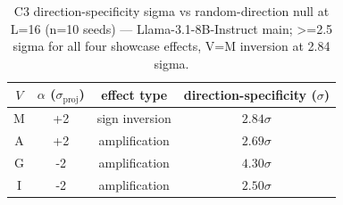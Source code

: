 \begin{table}[t]
\centering
\caption{C3 direction-specificity sigma vs random-direction null at L=16 (n=10 seeds) — Llama-3.1-8B-Instruct main; >=2.5 sigma for all four showcase effects, V=M inversion at 2.84 sigma.}
\label{tab:c3_direction_specificity}
\begin{tabular}{cccc}
\toprule
$V$ & $\alpha$ ($\sigma_{\mathrm{proj}}$) & effect type & direction-specificity ($\sigma$) \\
\midrule
M & +2 & sign inversion & $2.84\sigma$ \\
A & +2 & amplification & $2.69\sigma$ \\
G & -2 & amplification & $4.30\sigma$ \\
I & -2 & amplification & $2.50\sigma$ \\
\bottomrule
\end{tabular}
\end{table}
